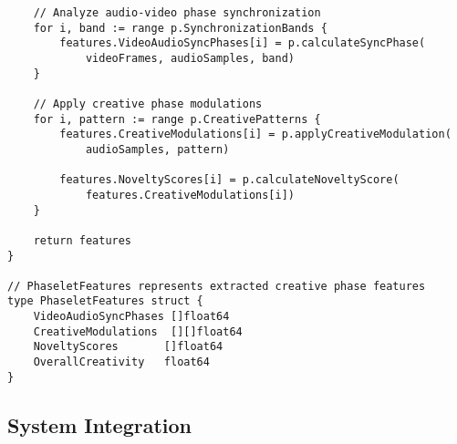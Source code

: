 \begin{tcolorbox}[colback=CodeBackground, colframe=DarkGray, title=Video-Audio Dataset Processing, fonttitle=\bfseries]
\begin{verbatim}
    // Analyze audio-video phase synchronization
    for i, band := range p.SynchronizationBands {
        features.VideoAudioSyncPhases[i] = p.calculateSyncPhase(
            videoFrames, audioSamples, band)
    }
    
    // Apply creative phase modulations
    for i, pattern := range p.CreativePatterns {
        features.CreativeModulations[i] = p.applyCreativeModulation(
            audioSamples, pattern)
        
        features.NoveltyScores[i] = p.calculateNoveltyScore(
            features.CreativeModulations[i])
    }
    
    return features
}

// PhaseletFeatures represents extracted creative phase features
type PhaseletFeatures struct {
    VideoAudioSyncPhases []float64
    CreativeModulations  [][]float64
    NoveltyScores       []float64
    OverallCreativity   float64
}
\end{verbatim}
\end{tcolorbox}

\subsection{System Integration}

